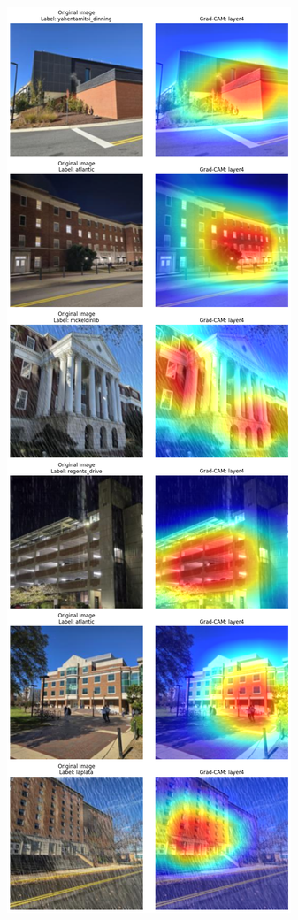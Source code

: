 \documentclass{article}
\begin{document}
\begin{figure}[H]
    \centering
    \begin{subfigure}[b]{0.45\linewidth}
        \centering
        \includegraphics[width=\linewidth]{new_gradcam_result2.png}

\end{subfigure}
\end{figure}
\end{document}
